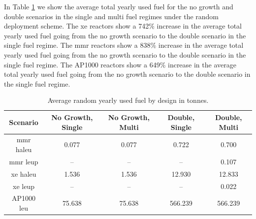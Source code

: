 In Table \ref{tab:random_used_avg} we show the average total yearly used fuel for the no growth and double scenarios in the single and multi fuel regimes under the random deployment scheme. The \gls{xe} reactors show a 742\% increase in the average total yearly used fuel going from the no growth scenario to the double scenario in the single fuel regime. The \gls{mmr} reactors show a 838\% increase in the average total yearly used fuel going from the no growth scenario to the double scenario in the single fuel regime. The AP1000 reactors show a 649\% increase in the average total yearly used fuel going from the no growth scenario to the double scenario in the single fuel regime.

\begin{table}[H]
    \centering
    \caption{Average random yearly used fuel by design in tonnes.}
    \label{tab:random_used_avg}
    \begin{tabular}{c c c c c}
       \hline
       Scenario & No Growth, Single & No Growth, Multi & Double, Single & Double, Multi  \\
       \hline
       \gls{mmr} \gls{haleu}   & 0.077    & 0.077   & 0.722    & 0.700    \\
       \gls{mmr} \gls{leup}    & --       & --      & --       & 0.107    \\
       \gls{xe} \gls{haleu}    & 1.536    & 1.536   & 12.930   & 12.833   \\
       \gls{xe} \gls{leup}     & --       & --      & --       & 0.022    \\
       AP1000 \gls{leu}        & 75.638   & 75.638  & 566.239  & 566.239  \\
       \hline
    \end{tabular}
\end{table}

